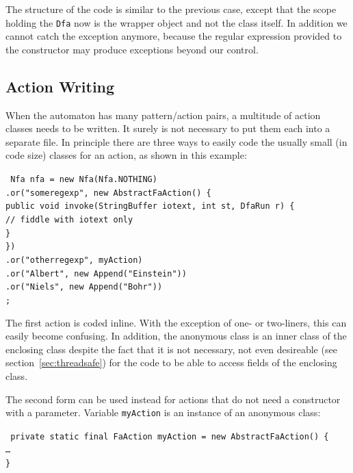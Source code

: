 \documentclass[12pt,a4paper,halfparskip]{scrartcl}
\newenvironment{codexa}%
{\begin{lrbox}{\codebox}\begin{minipage}{0.85\textwidth}\small\tt}
{\end{minipage}\end{lrbox}\begin{center}\setlength{\fboxrule}{1pt}\setlength{\fboxsep}{1em}\fcolorbox{codexab}{codexa}{\usebox{\codebox}}\end{center}}
\newcommand{\code}[1]{\texttt{#1}}
\newcommand{\T}{\hspace*{2ex}}
\begin{document}
The structure of the code is similar to the previous case, except that
the scope holding the \code{Dfa} now is the wrapper object and not the
class itself. In addition we cannot catch the exception anymore,
because the regular expression provided to the constructor may produce
exceptions beyond our control.

\subsection{Action Writing}

When the automaton has many pattern/action pairs, a multitude of
action classes needs to be written. It surely is not necessary to put
them each into a separate file. In principle there are three ways to
easily code the usually small (in code size) classes for an action, as
shown in this example:

\begin{codexa}
  Nfa nfa = new Nfa(Nfa.NOTHING)\\
  \T .or("someregexp", new AbstractFaAction() \{\\
  \T\T\T public void invoke(StringBuffer iotext, int st, DfaRun r) \{\\
  \T\T\T\T // fiddle with iotext only\\
  \T\T\T \}\\
  \T\T \})\\
  \T .or("otherregexp", myAction)\\
  \T .or("Albert", new Append("Einstein"))\\
  \T .or("Niels", new Append("Bohr"))\\
  \T;
\end{codexa}

The first action is coded inline. With the exception of one- or
two-liners, this can easily become confusing. In addition, the
anonymous class is an inner class of the enclosing class despite the
fact that it is not necessary, not even desireable
(see section~\ref{sec:threadsafe}) for the code to be able to access
fields of the enclosing class.

The second form can be used instead for actions that do not need a
constructor with a parameter. Variable \code{myAction} is an
instance of an anonymous class:

\begin{codexa}
  private static final FaAction myAction = new AbstractFaAction() \{\\
  \T \dots\\
  \}
\end{codexa}
\end{document}
